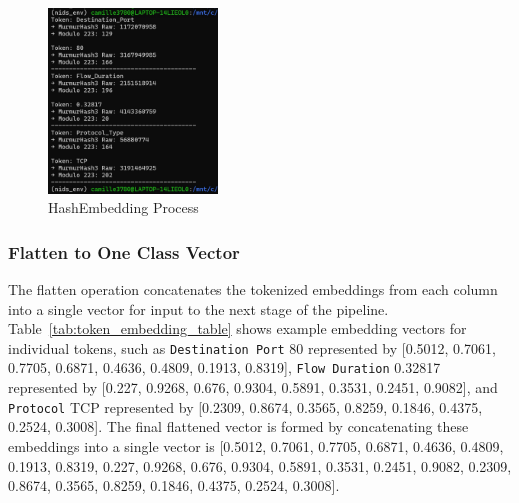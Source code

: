 \begin{ZhChapter}
    \begin{figure}[htbp]
        \centering
        \includegraphics[width = 0.4\textwidth]{image/2025-06-30 002218.jpg}
        \caption{HashEmbedding Process}
        \label{fig:hashembedding}
    \end{figure}





    \newpage
    \subsubsection{Flatten to One Class Vector}
    The flatten operation concatenates the tokenized embeddings from each column into a single vector for input to the next stage of the pipeline. Table~\ref{tab:token_embedding_table} shows example embedding vectors for individual tokens, such as \texttt{Destination Port} 80 represented by [0.5012, 0.7061, 0.7705, 0.6871, 0.4636, 0.4809, 0.1913, 0.8319], \texttt{Flow Duration} 0.32817 represented by [0.227, 0.9268, 0.676, 0.9304, 0.5891, 0.3531, 0.2451, 0.9082], and \texttt{Protocol} TCP represented by [0.2309, 0.8674, 0.3565, 0.8259, 0.1846, 0.4375, 0.2524, 0.3008]. The final flattened vector is formed by concatenating these embeddings into a single vector is [0.5012, 0.7061, 0.7705, 0.6871, 0.4636, 0.4809, 0.1913, 0.8319, 0.227, 0.9268, 0.676, 0.9304, 0.5891, 0.3531, 0.2451, 0.9082, 0.2309, 0.8674, 0.3565, 0.8259, 0.1846, 0.4375, 0.2524, 0.3008].




\end{ZhChapter}
